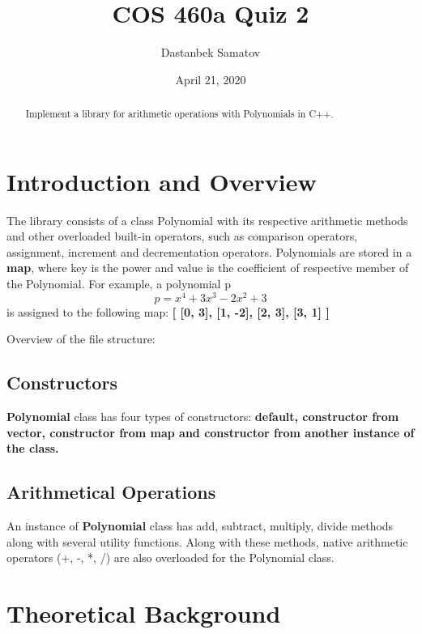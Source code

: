 \documentclass{article}
\title{COS 460a Quiz 2}
\author{Dastanbek Samatov}
\date{April 21, 2020}
\begin{document}
\maketitle

\begin{abstract}
    Implement a library for arithmetic operations with Polynomials in C++.
\end{abstract}

\section{Introduction and Overview}

The library consists of a class Polynomial with its respective arithmetic methods and
other overloaded built-in operators, such as comparison operators, assignment, 
increment and decrementation operators. Polynomials are stored in a \textbf{map}, where
key is the power and value is the coefficient of respective member of the Polynomial.
For example, a polynomial p 
\begin{equation}
    p = x^4 + 3x^3 - 2x^2 + 3 
\end{equation}
is assigned to the following map: \textbf{[ [0, 3], [1, -2], [2, 3], [3, 1] ]}

Overview of the file structure:
\subsection{Constructors}
\textbf{Polynomial} class has four types of constructors: \textbf{default, constructor from 
vector, constructor from map and constructor from another instance of the class.}

\subsection{Arithmetical Operations}
An instance of \textbf{Polynomial} class has add, subtract, multiply, divide methods along
with several utility functions. Along with these methods, native arithmetic 
operators (+, -, *, /) are also overloaded for the Polynomial class.

\section{Theoretical Background}
\end{document}
